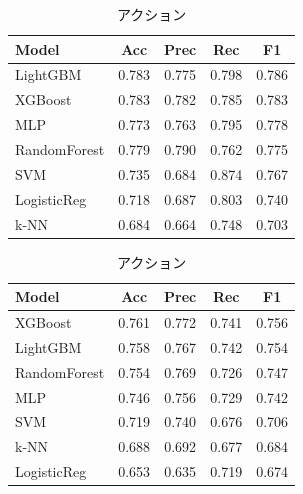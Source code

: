 \documentclass[uplatex, dvipdfmx, 11pt, a4paper, report]{jsbook}
\begin{document}
\begin{table}[H]
  \small
  \begin{minipage}[t]{0.49\textwidth}
    \centering
    \caption{ホラー}
    \begin{tabular}{l|c|c|c|c} \hline
      Model & Acc & Prec & Rec & F1 \\ \hline
      LightGBM & 0.783 & 0.775 & 0.798 & 0.786 \\
      XGBoost & 0.783 & 0.782 & 0.785 & 0.783 \\
      MLP & 0.773 & 0.763 & 0.795 & 0.778 \\
      RandomForest & 0.779 & 0.790 & 0.762 & 0.775 \\
      SVM & 0.735 & 0.684 & 0.874 & 0.767 \\
      LogisticReg & 0.718 & 0.687 & 0.803 & 0.740 \\
      k-NN & 0.684 & 0.664 & 0.748 & 0.703 \\ \hline
    \end{tabular}
  \end{minipage}
  \hfill
  \begin{minipage}[t]{0.49\textwidth}
    \centering
    \caption{アクション}
    \begin{tabular}{l|c|c|c|c} \hline
      Model & Acc & Prec & Rec & F1 \\ \hline
      XGBoost & 0.761 & 0.772 & 0.741 & 0.756 \\
      LightGBM & 0.758 & 0.767 & 0.742 & 0.754 \\
      RandomForest & 0.754 & 0.769 & 0.726 & 0.747 \\
      MLP & 0.746 & 0.756 & 0.729 & 0.742 \\
      SVM & 0.719 & 0.740 & 0.676 & 0.706 \\
      k-NN & 0.688 & 0.692 & 0.677 & 0.684 \\
      LogisticReg & 0.653 & 0.635 & 0.719 & 0.674 \\ \hline
    \end{tabular}
  \end{minipage}
\end{table}
\end{document}
